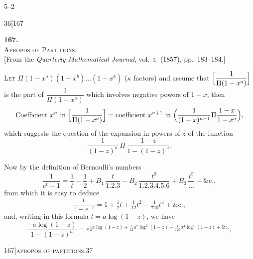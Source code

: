 \documentclass[11pt]{article}
\begin{document}
\begin{flushright}\small 5--2\end{flushright}

\newpage

\begin{center}
\small\textsc{36}\hfill\hfill[167
\end{center}

\bigskip

\begin{center}
{\large\textbf{167.}}\\[1em]
{\large\scshape Apropos of Partitions.}\\[1em]
{\small [From the \textit{Quarterly Mathematical Journal}, vol.~\textsc{i}.\ (1857), pp.~183--184.]}
\end{center}

\bigskip

\textsc{Let} $\Pi(1 - x^{a})(1 - x^{b})\ldots(1 - x^{k})$ ($\kappa$ factors) and assume that $\Bigl[\dfrac{1}{\Pi(1 - x^{a})}\Bigr]$ is
the part of $\dfrac{1}{\Pi(1 - x^{a})}$ which involves negative powers of $1 - x$, then
\[
\text{Coefficient } x^{n} \text{ in } \Bigl[\frac{1}{\Pi(1 - x^{a})}\Bigr] = \text{coefficient } x^{n+1} \text{ in } \Bigl(\frac{1}{(1 - x)^{n+1}}\Pi\frac{1 - x}{1 - x^{a}}\Bigr),
\]
which suggests the question of the expansion in powers of $z$ of the function
\[
\frac{1}{(1 - z)^{a}}\,\Pi\,\frac{1 - z}{1 - (1 - z)^{a}}.
\]

Now by the definition of Bernoulli's numbers
\[
\frac{1}{e^{t} - 1} = \frac{1}{t} - \frac{1}{2} + B_{1}\,\frac{t}{1.2.3} - B_{2}\,\frac{t^{3}}{1.2.3.4.5.6} + B_{3}\,\frac{t^{5}}{\ldots} - \&\text{c.},
\]
from which it is easy to deduce
\[
\frac{t}{1 - e^{-t}} = 1 + \tfrac{1}{2}t + \tfrac{1}{12}t^{2} - \tfrac{1}{720}t^{4} + \&\text{c.},
\]
and, writing in this formula $t = a\log(1 - z)$, we have
\[
\frac{-a\log(1 - z)}{1 - (1 - z)^{a}} = e^{\frac{1}{2} a\log(1-z) + \tfrac{1}{12}a^{2}\log^{2}(1-z) - \tfrac{1}{720}a^{4}\log^{4}(1-z) + \&\text{c.}},
\]

\newpage

\begin{center}
\small 167]\hfill\textsc{apropos of partitions.}\hfill\textsc{37}
\end{center}
\end{document}
